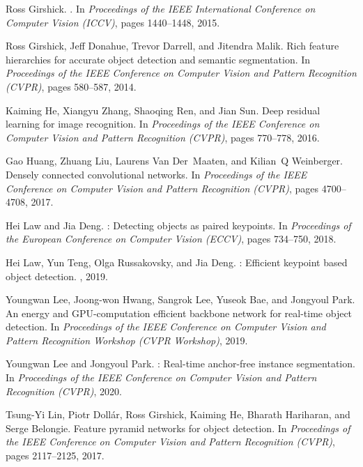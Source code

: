 \documentclass[10pt,twocolumn,letterpaper]{article}
\begin{document}
{\begin{thebibliography}{10}
	Ross Girshick.
	.
	\newblock In {\em Proceedings of the IEEE International Conference on Computer
		Vision (ICCV)}, pages 1440--1448, 2015.
	
	Ross Girshick, Jeff Donahue, Trevor Darrell, and Jitendra Malik.
	\newblock Rich feature hierarchies for accurate object detection and semantic
	segmentation.
	\newblock In {\em Proceedings of the IEEE Conference on Computer Vision and
		Pattern Recognition (CVPR)}, pages 580--587, 2014.
	
	Kaiming He, Xiangyu Zhang, Shaoqing Ren, and Jian Sun.
	\newblock Deep residual learning for image recognition.
	\newblock In {\em Proceedings of the IEEE Conference on Computer Vision and
		Pattern Recognition (CVPR)}, pages 770--778, 2016.
	
	Gao Huang, Zhuang Liu, Laurens Van Der~Maaten, and Kilian~Q Weinberger.
	\newblock Densely connected convolutional networks.
	\newblock In {\em Proceedings of the IEEE Conference on Computer Vision and
		Pattern Recognition (CVPR)}, pages 4700--4708, 2017.
	
	Hei Law and Jia Deng.
	: Detecting objects as paired keypoints.
	\newblock In {\em Proceedings of the European Conference on Computer Vision
		(ECCV)}, pages 734--750, 2018.
	
	Hei Law, Yun Teng, Olga Russakovsky, and Jia Deng.
	: Efficient keypoint based object detection.
	, 2019.
	
	Youngwan Lee, Joong-won Hwang, Sangrok Lee, Yuseok Bae, and Jongyoul Park.
	\newblock An energy and {GPU-computation} efficient backbone network for
	real-time object detection.
	\newblock In {\em Proceedings of the IEEE Conference on Computer Vision and
		Pattern Recognition Workshop (CVPR Workshop)}, 2019.
	
	Youngwan Lee and Jongyoul Park.
	: Real-time anchor-free instance segmentation.
	\newblock In {\em Proceedings of the IEEE Conference on Computer Vision and
		Pattern Recognition (CVPR)}, 2020.
	
	Tsung-Yi Lin, Piotr Doll{\'a}r, Ross Girshick, Kaiming He, Bharath Hariharan,
	and Serge Belongie.
	\newblock Feature pyramid networks for object detection.
	\newblock In {\em Proceedings of the IEEE Conference on Computer Vision and
		Pattern Recognition (CVPR)}, pages 2117--2125, 2017.
	

\end{thebibliography}}
\end{document}

